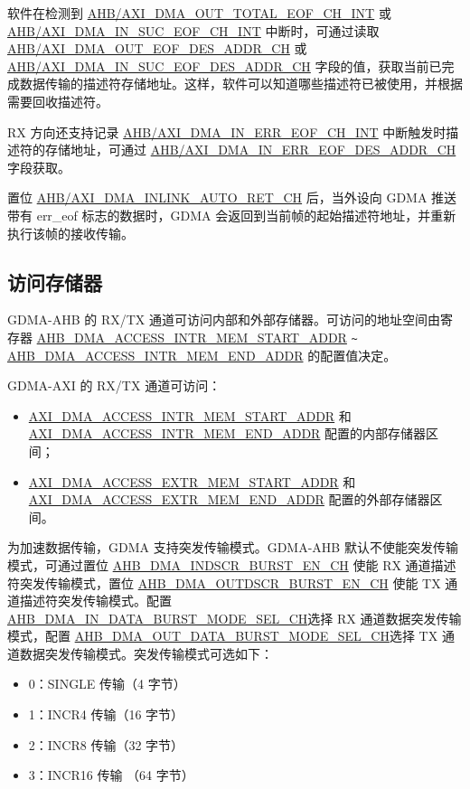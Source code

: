 \documentclass[main\_\_CN.tex]{subfiles}
\begin{document}
软件在检测到 \hyperref[int:GDMAOUTTOTALEOFINT]{AHB/AXI\_DMA\_OUT\_TOTAL\_EOF\_CH\_INT} 或 \hyperref[int:GDMAINSUCEOFINT]{AHB/AXI\_DMA\_IN\_SUC\_EOF\_CH\_INT} 中断时，可通过读取 \hyperref[fielddesc:AHBDMAOUTEOFDESADDRCHN]{AHB/AXI\_DMA\_OUT\_EOF\_DES\_ADDR\_CH} 或 \hyperref[fielddesc:AHBDMAINSUCEOFDESADDRCHN]{AHB/AXI\_DMA\_IN\_SUC\_EOF\_DES\_ADDR\_CH} 字段的值，获取当前已完成数据传输的描述符存储地址。这样，软件可以知道哪些描述符已被使用，并根据需要回收描述符。

RX 方向还支持记录 \hyperref[int:GDMAINERREOFINT]{AHB/AXI\_DMA\_IN\_ERR\_EOF\_CH\_INT} 中断触发时描述符的存储地址，可通过 \hyperref[fielddesc:AHBDMAINERREOFDESADDRCHN]{AHB/AXI\_DMA\_IN\_ERR\_EOF\_DES\_ADDR\_CH} 字段获取。

置位 \hyperref[fielddesc:AHBDMAINLINKAUTORETCHN]{AHB/AXI\_DMA\_INLINK\_AUTO\_RET\_CH} 后，当外设向 GDMA 推送带有 err\_eof 标志的数据时，GDMA 会返回到当前帧的起始描述符地址，并重新执行该帧的接收传输。

\subsection{访问存储器}\label{sec:dma-access-inter-ram}
GDMA-AHB 的 RX/TX 通道可访问内部和外部存储器。可访问的地址空间由寄存器 \hyperref[fielddesc:AHBDMAACCESSINTRMEMSTARTADDR]{AHB\_DMA\_ACCESS\_INTR\_MEM\_START\_ADDR} \verb+~+ \hyperref[fielddesc:AHBDMAACCESSINTRMEMENDADDR]{AHB\_DMA\_ACCESS\_INTR\_MEM\_END\_ADDR} 的配置值决定。

GDMA-AXI 的 RX/TX 通道可访问：
\begin{itemize}
    \item \hyperref[fielddesc:AXIDMAACCESSINTRMEMSTARTADDR]{AXI\_DMA\_ACCESS\_INTR\_MEM\_START\_ADDR} 和 \hyperref[fielddesc:AXIDMAACCESSINTRMEMENDADDR]{AXI\_DMA\_ACCESS\_INTR\_MEM\_END\_ADDR} 配置的内部存储器区间；
    \item \hyperref[fielddesc:AXIDMAACCESSEXTRMEMSTARTADDR]{AXI\_DMA\_ACCESS\_EXTR\_MEM\_START\_ADDR} 和 \hyperref[fielddesc:AXIDMAACCESSEXTRMEMENDADDR]{AXI\_DMA\_ACCESS\_EXTR\_MEM\_END\_ADDR} 配置的外部存储器区间。
\end{itemize}

为加速数据传输，GDMA 支持突发传输模式。GDMA-AHB 默认不使能突发传输模式，可通过置位 \hyperref[fielddesc:AHBDMAINDSCRBURSTENCHN]{AHB\_DMA\_INDSCR\_BURST\_EN\_CH} 使能 RX 通道描述符突发传输模式，置位 \hyperref[fielddesc:AHBDMAOUTDSCRBURSTENCHN]{AHB\_DMA\_OUTDSCR\_BURST\_EN\_CH} 使能 TX 通道描述符突发传输模式。配置\hyperref[fielddesc:AHBDMAINDATABURSTMODESELCHN]{AHB\_DMA\_IN\_DATA\_BURST\_MODE\_SEL\_CH}选择 RX 通道数据突发传输模式，配置 \hyperref[fielddesc:AHBDMAOUTDATABURSTMODESELCHN]{AHB\_DMA\_OUT\_DATA\_BURST\_MODE\_SEL\_CH}选择 TX 通道数据突发传输模式。突发传输模式可选如下：
\begin{itemize}
    \item 0：SINGLE 传输（4 字节）
    \item 1：INCR4 传输（16 字节）
    \item 2：INCR8 传输（32 字节）
    \item 3：INCR16 传输 （64 字节）
\end{itemize}
\end{document}
